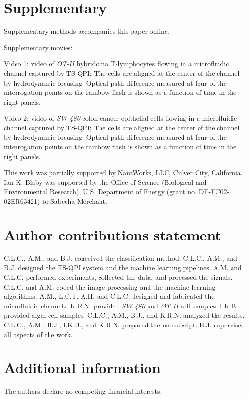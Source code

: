 \documentclass[aps,pra,reprint,superscriptaddress]{revtex4-1}
\begin{document}








\section*{Supplementary}
Supplementary methods accompanies this paper online.

Supplementary movies:

Video 1: video of \textit{OT-II} hybridoma T-lymphocytes flowing in a microfluidic channel captured by TS-QPI; The cells are aligned at the center of the channel by hydrodynamic focusing. Optical path difference measured at four of the interrogation points on the rainbow flash is shown as a function of time in the right panels.

Video 2: video of \textit{SW-480} colon cancer epithelial cells flowing in a microfluidic channel captured by TS-QPI; The cells are aligned at the center of the channel by hydrodynamic focusing. Optical path difference measured at four of the interrogation points on the rainbow flash is shown as a function of time in the right panels.

\begin{acknowledgments}
This work was partially supported by NantWorks, LLC, Culver City, California. Ian K. Blaby was supported by the Office of Science (Biological and Environmental Research), U.S. Department of Energy (grant no. DE-FC02-02ER63421) to Sabeeha Merchant.
\end{acknowledgments}

\section*{Author contributions statement}

C.L.C., A.M., and B.J. conceived the classification method. C.L.C., A.M., and B.J. designed the TS-QPI system and the machine learning pipelines. A.M. and C.L.C. performed experiments, collected the data, and processed the signals. C.L.C. and A.M. coded the image processing and the machine learning algorithms. A.M., L.C.T. A.H. and C.L.C. designed and fabricated the microfluidic channels. K.R.N. provided \textit{SW-480} and \textit{OT-II} cell samples. I.K.B. provided algal cell samples. C.L.C., A.M., B.J., and K.R.N. analyzed the results. C.L.C., A.M., B.J., I.K.B., and K.R.N. prepared the manuscript. B.J. supervised all aspects of the work.

\section*{Additional information}

The authors declare no competing financial interests.
\end{document}
